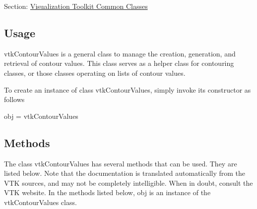 Section\-: \hyperlink{sec_vtkcommon}{Visualization Toolkit Common Classes} \hypertarget{vtkwidgets_vtkxyplotwidget_Usage}{}\subsection{Usage}\label{vtkwidgets_vtkxyplotwidget_Usage}
vtk\-Contour\-Values is a general class to manage the creation, generation, and retrieval of contour values. This class serves as a helper class for contouring classes, or those classes operating on lists of contour values.

To create an instance of class vtk\-Contour\-Values, simply invoke its constructor as follows \begin{DoxyVerb}  obj = vtkContourValues
\end{DoxyVerb}
 \hypertarget{vtkwidgets_vtkxyplotwidget_Methods}{}\subsection{Methods}\label{vtkwidgets_vtkxyplotwidget_Methods}
The class vtk\-Contour\-Values has several methods that can be used. They are listed below. Note that the documentation is translated automatically from the V\-T\-K sources, and may not be completely intelligible. When in doubt, consult the V\-T\-K website. In the methods listed below, {\ttfamily obj} is an instance of the vtk\-Contour\-Values class. 
